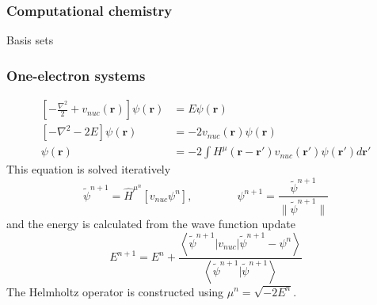 \documentclass[mathserif]{beamer}
\begin{document}
\begin{frame}
    \frametitle{Computational chemistry}
    Basis sets
\end{frame}

\begin{frame}
    \frametitle{One-electron systems}
    \begin{align}
	\left[-\frac{\nabla^2}{2} + v_{nuc}(\boldsymbol{r})\right]\psi(\boldsymbol{r}) &=
	E\psi(\boldsymbol{r})\\
	\left[-\nabla^2 - 2E\right]\psi(\boldsymbol{r}) &=
	-2v_{nuc}(\boldsymbol{r})\psi(\boldsymbol{r})\\
	\psi(\boldsymbol{r}) &=
	-2\int H^\mu(\boldsymbol{r}-\boldsymbol{r}') v_{nuc}(\boldsymbol{r}')\psi(\boldsymbol{r}') 
	d\boldsymbol{r}'
    \end{align}
    This equation is solved iteratively
    \begin{equation}
	\tilde{\psi}^{n+1} = \hat{H}^{\mu^n}\left[v_{nuc}\psi^n\right], \qquad \qquad
	\psi^{n+1} = \frac{\tilde{\psi}^{n+1}}{\|\tilde{\psi}^{n+1}\|}
    \end{equation}
    and the energy is calculated from the wave function update
    \begin{equation}
	E^{n+1} = E^n + \frac{\left<\tilde{\psi}^{n+1}|v_{nuc}|\tilde{\psi}^{n+1} - \psi^n\right>}
	    {\left<\tilde{\psi}^{n+1}|\tilde{\psi}^{n+1}\right>}
    \end{equation}
    The Helmholtz operator is constructed using $\mu^n = \sqrt{-2E^n}$.
\end{frame}
\end{document}
